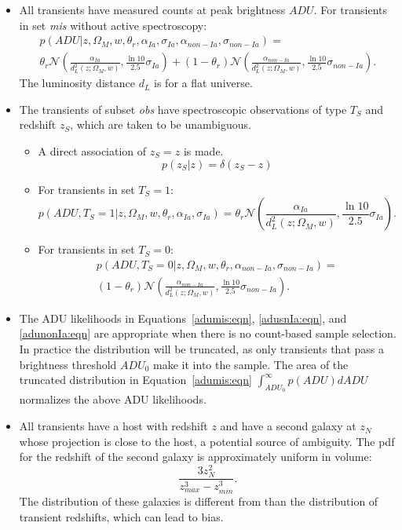 \documentclass[preprint]{aastex}
\begin{document}
\begin{itemize}
\item All transients have measured counts at peak brightness $\mathit{ADU}$.
For transients in set {\it mis} without active spectroscopy:
\begin{multline}
p(\mathit{ADU}| z, \Omega_M, w, \theta_r, \alpha_{Ia},\sigma_{Ia}, \alpha_{\mathit{non-Ia}},\sigma_{\mathit{non-Ia}})=\\
\theta_r\mathcal{N}\left(\frac{\alpha_{Ia}}{d_L^2(z;\Omega_M, w)}, \frac{\ln{10}}{2.5}\sigma_{Ia}\right)+\left(1-\theta_r\right)
\mathcal{N}\left(\frac{\alpha_{\mathit{non-Ia}}}{d_L^2(z;\Omega_M, w)}, \frac{\ln{10}}{2.5}\sigma_{\mathit{non-Ia}}\right).
\label{adumis:eqn}
\end{multline}
The luminosity distance $d_L$ is for a flat universe.  
\item The transients of subset {\it obs} have spectroscopic observations of type $T_S$ and redshift
$z_S$, which are taken to be unambiguous.
\begin{itemize}
\item A direct association of $z_S=z$ is made.
\begin{equation}
p(z_S|z) = \delta(z_S-z)
\label{specz:eqn}
\end{equation}
\item For transients in set $T_S=1$:
\begin{equation}
p(\mathit{ADU}, T_S=1 | z, \Omega_M, w, \theta_r, \alpha_{Ia},\sigma_{Ia})=
\theta_r\mathcal{N}\left(\frac{\alpha_{Ia}}{d_L^2(z;\Omega_M, w)}, \frac{\ln{10}}{2.5}\sigma_{Ia}\right).
\label{adusnIa:eqn}
\end{equation}
\item For transients in set $T_S=0$:
\begin{multline}
p(\mathit{ADU}, T_S=0 | z, \Omega_M, w, \theta_r, \alpha_{\mathit{non-Ia}},\sigma_{\mathit{non-Ia}})= \\
\left(1-\theta_r\right)
\mathcal{N}\left(\frac{\alpha_{\mathit{non-Ia}}}{d_L^2(z;\Omega_M, w)}, \frac{\ln{10}}{2.5}\sigma_{\mathit{non-Ia}}\right).
\label{adunonIa:eqn}
\end{multline}
\end{itemize}
\item The ADU likelihoods in Equations~\ref{adumis:eqn}, \ref{adusnIa:eqn}, and
\ref{adunonIa:eqn} are appropriate when there is no count-based sample selection.
In practice the distribution will be truncated, as only transients that pass a brightness
threshold $\mathit{ADU}_0$ make it into the sample.  The area of the truncated
distribution in Equation~\ref{adumis:eqn} $\int_{\mathit{ADU}_0}^{\infty} p(\mathit{ADU})d\mathit{ADU}$
normalizes the above ADU likelihoods.
\item All transients have a host with redshift $z$ and have a second
galaxy at $z_N$ whose projection is close to the host, a potential source of ambiguity.
The pdf for the redshift of the second galaxy is approximately uniform in volume:
\begin{equation}
\frac{3 z_N^2}{z_{max}^3 - z_{min}^3}.
\end{equation}
The distribution of these galaxies is different from than the distribution of transient redshifts,
which can lead to bias.


\end{itemize}
\end{document}
